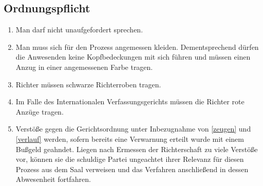 \documentclass{article}
\begin{document}
\subsection{Ordnungspflicht}\label{gordnung}
\begin{enumerate}[(1)]
    \item Man darf nicht unaufgefordert sprechen.
    \item Man muss sich für den Prozess angemessen kleiden. Dementsprechend dürfen die Anwesenden keine Kopfbedeckungen mit sich führen und müssen einen Anzug in einer angemessenen Farbe tragen.
    \item Richter müssen schwarze Richterroben tragen.
    \item Im Falle des Internationalen Verfassungsgerichts müssen die Richter rote Anzüge tragen.
    \item Verstöße gegen die Gerichtsordnung unter Inbezugnahme von \ref{zeugen} und \ref{verlauf} werden, sofern bereits eine Verwarnung erteilt wurde mit einem Bußgeld geahndet. Liegen nach Ermessen der Richterschaft zu viele Verstöße vor, können sie die schuldige Partei ungeachtet ihrer Relevanz für diesen Prozess aus dem Saal verweisen und das Verfahren anschließend in dessen Abwesenheit fortfahren.
\end{enumerate}
\end{document}
